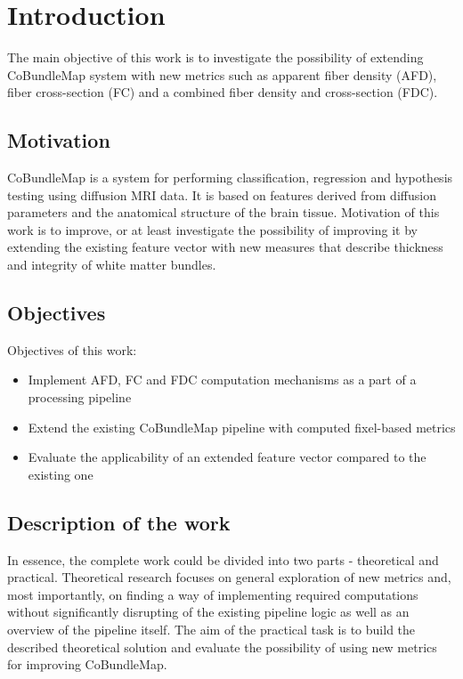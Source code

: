 \documentclass[thesis.tex]{subfiles}
\begin{document}
\chapter{Introduction}

The main objective of this work is to investigate the possibility of extending CoBundleMap system
with new metrics such as apparent fiber density (AFD), fiber cross-section (FC) and a combined fiber density and cross-section (FDC).

\section{Motivation}

CoBundleMap is a system for performing classification, regression and hypothesis testing using diffusion MRI data. It is based on features derived from diffusion parameters and the anatomical structure of the brain tissue. Motivation of this work is to improve, or at least investigate the possibility of improving it by
extending the existing feature vector with new measures that describe thickness and integrity of white matter bundles.


\section{Objectives}

Objectives of this work:
\begin{itemize}
  \item Implement AFD, FC and FDC computation mechanisms as a part of a processing pipeline
  \item Extend the existing CoBundleMap pipeline with computed fixel-based metrics
  \item Evaluate the applicability of an extended feature vector compared to the existing one
\end{itemize}

\section{Description of the work}

In essence, the complete work could be divided into two parts - theoretical and practical.
Theoretical research focuses on general exploration of new metrics and, most importantly, on finding a way of implementing
required computations without significantly disrupting of the existing pipeline logic as well as an overview of the pipeline itself. The aim of the practical task is to build the described theoretical solution and evaluate the possibility of using new metrics for improving CoBundleMap.


\end{document}
